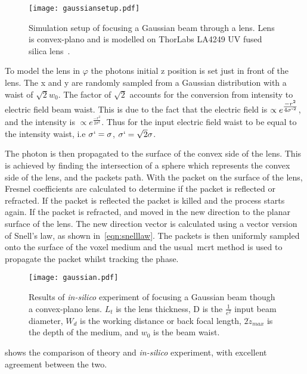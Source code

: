 \begin{figure}[!ht]
    \centering
    \texttt{[image: gaussiansetup.pdf]}
    \caption{Simulation setup of focusing a Gaussian beam through a lens. Lens is convex-plano and is modelled on ThorLabs LA4249 UV fused silica lens~\cite{thorlens}.}
    \label{fig:gausssetup}
\end{figure}

To model the lens in $\varphi$ the photons initial z position is set just in front of the lens.
The x and y are randomly sampled from a Gaussian distribution with a waist of $\sqrt{2}w_0$.
The factor of $\sqrt{2}$ accounts for the conversion from intensity to electric field beam waist.
This is due to the fact that the electric field is $\propto e^{\tfrac{-r^2}{4\sigma`^2}}$, and the intensity is $\propto e^{\tfrac{-r^2}{2\sigma^2}}$.
Thus for the input electric field waist to be equal to the intensity waist, i.e $\sigma`=\sigma$, $\sigma`=\sqrt{2}\sigma$.

The photon is then propagated to the surface of the convex side of the lens.
This is achieved by finding the intersection of a sphere which represents the convex side of the lens, and the packets path.
With the packet on the surface of the lens, Fresnel coefficients are calculated to determine if the packet is reflected or refracted.
If the packet is reflected the packet is killed and the process starts again.
If the packet is refracted, and moved in the new direction to the planar surface of the lens.
The new direction vector is calculated using a vector version of Snell's law, as shown in~\cref{eqn:snelllaw}.
The packets is then uniformly sampled onto the surface of the voxel medium and the usual~\gls*{mcrt} method is used to propagate the packet whilst tracking the phase.

\begin{figure}[!ht]
    \centering
    \texttt{[image: gaussian.pdf]}
    \caption{Results of \textit{in-silico} experiment of focusing a Gaussian beam though a convex-plano lens. $L_t$ is the lens thickness, D is the $\tfrac{1}{e^2}$ input beam diameter, $W_d$ is the working distance or back focal length, $2\dot z_{max}$ is the depth of the medium, and $w_0$ is the beam waist.}
    \label{fig:simgaussexp}
\end{figure}


 shows the comparison of theory and \textit{in-silico} experiment, with excellent agreement between the two.

